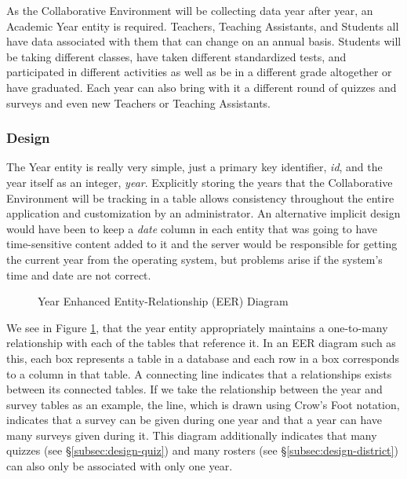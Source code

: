 As the Collaborative Environment will be collecting data year after year, an Academic Year entity is required. Teachers, Teaching Assistants, and Students all have data associated with them that can change on an annual basis. Students will be taking different classes, have taken different standardized tests, and participated in different activities as well as be in a different grade altogether or have graduated. Each year can also bring with it a different round of quizzes and surveys and even new Teachers or Teaching Assistants.


\subsubsection{Design}
The Year entity is really very simple, just a primary key identifier, \emph{id}, and the year itself as an integer, \emph{year}. Explicitly storing the years that the Collaborative Environment will be tracking in a table allows consistency throughout the entire application and customization by an administrator. An alternative implicit design would have been to keep a \emph{date} column in each entity that was going to have time-sensitive content added to it and the server would be responsible for getting the current year from the operating system, but problems arise if the system's time and date are not correct. 

\begin{figure}[h!]
	\centering
	\caption{Year Enhanced Entity-Relationship (EER) Diagram}
	\label{fig:er-year}
\end{figure}

We see in Figure \ref{fig:er-year}, that the year entity appropriately maintains a one-to-many relationship with each of the tables that reference it. In an EER diagram such as this, each box represents a table in a database and each row in a box corresponds to a column in that table. A connecting line indicates that a relationships exists between its connected tables. If we take the relationship between the year and survey tables as an example, the line, which is drawn using Crow's Foot notation, indicates that a survey can be given during one year and that a year can have many surveys given during it. This diagram additionally indicates that many quizzes (see \S \ref{subsec:design-quiz}) and many rosters (see \S \ref{subsec:design-district}) can also only be associated with only one year.

